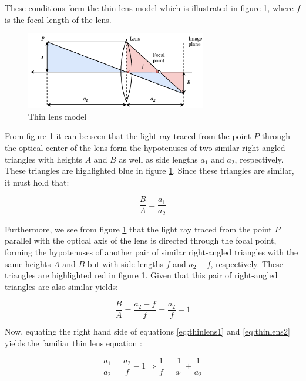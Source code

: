 These conditions form the thin lens model which is illustrated in figure \ref{fig:thinlensmodel}, where $f$ is the focal length of the lens.
\begin{figure}[h]
    \centering
    \includegraphics[width=0.7\textwidth]{figures/reconstruction/thinlensmodel2.pdf}
    \caption{Thin lens model}
    \label{fig:thinlensmodel}
\end{figure}

From figure \ref{fig:thinlensmodel} it can be seen that the light ray traced from the point $P$ through the optical center of the lens form the hypotenuses of two similar right-angled triangles with heights $A$ and $B$ as well as side lengths $a_{1}$ and $a_{2}$, respectively. These triangles are highlighted blue in figure \ref{fig:thinlensmodel}. Since these triangles are similar, it must hold that:

\begin{equation}
\label{eq:thinlens1}
    \frac{B}{A} = \frac{a_{1}}{a_{2}}
\end{equation}

Furthermore, we see from figure \ref{fig:thinlensmodel} that the light ray traced from the point $P$ parallel with the optical axis of the lens is directed through the focal point, forming the hypotenuses of another pair of similar right-angled triangles with the same heights $A$ and $B$ but with side lengths $f$ and $a_{2}-f$, respectively. These triangles are highlighted red in figure \ref{fig:thinlensmodel}. Given that this pair of right-angled triangles are also similar yields:

\begin{equation}
\label{eq:thinlens2}
    \frac{B}{A} = \frac{a_{2}-f}{f} = \frac{a_{2}}{f}-1
\end{equation}

Now, equating the right hand side of equations \ref{eq:thinlens1} and \ref{eq:thinlens2} yields the familiar thin lens equation \cite{imageformationDTU}:

\begin{equation}
\label{eq:thinlensequation}
    \frac{a_{1}}{a_{2}} = \frac{a_{2}}{f}-1 \Rightarrow \frac{1}{f} = \frac{1}{a_{1}} + \frac{1}{a_{2}}
\end{equation}

